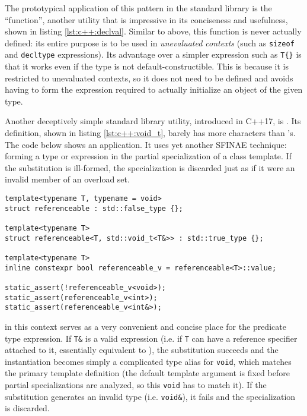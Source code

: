 The prototypical application of this pattern in the standard library is the
 ``function'', another utility that is impressive in its
conciseness and usefulness, shown in listing \ref{lst:c++:declval}.  Similar to
 above, this function is never actually defined: its
entire purpose is to be used in \textit{unevaluated contexts} (such as
\texttt{sizeof} and \texttt{decltype} expressions).  Its advantage over a
simpler expression such as \texttt{T\{\}} is that it works even if the type is
not default-constructible.  This is because it is restricted to unevaluated
contexts, so it does not need to be defined and avoids having to form the
expression required to actually initialize an object of the given type.

Another deceptively simple standard library utility, introduced in C++17, is
.  Its definition, shown in listing \ref{lst:c++:void_t}, barely
has more characters than 's.  The code below shows an
application.  It uses yet another SFINAE technique: forming a type or expression
in the partial specialization of a class template.  If the substitution is
ill-formed, the specialization is discarded just as if it were an invalid member
of an overload set\footnotemark.


\begin{lstlisting}[style=c++]
template<typename T, typename = void>
struct referenceable : std::false_type {};

template<typename T>
struct referenceable<T, std::void_t<T&>> : std::true_type {};

template<typename T>
inline constexpr bool referenceable_v = referenceable<T>::value;

static_assert(!referenceable_v<void>);
static_assert(referenceable_v<int>);
static_assert(referenceable_v<int&>);
\end{lstlisting}

 in this context serves as a very convenient and concise place for
the predicate type expression.  If \texttt{T\&} is a valid expression (i.e. if
\texttt{T} can have a reference specifier attached to it, essentially equivalent
to ), the substitution succeeds and the
 instantiation becomes simply a complicated type alias for
\texttt{void}, which matches the primary template definition (the default
template argument is fixed before partial specializations are analyzed, so this
\texttt{void} has to match it).  If the substitution generates an invalid type
(i.e. \texttt{void\&}), it fails and the specialization is discarded.

